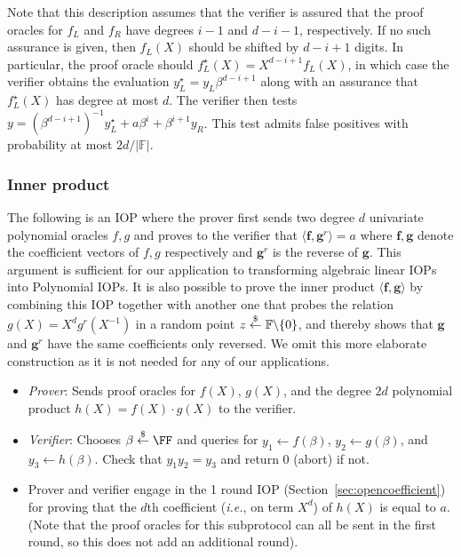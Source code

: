 Note that this description assumes that the verifier is assured that the proof oracles for $f_L$ and $f_R$ have degrees $i-1$ and $d-i-1$, respectively. If no such assurance is given, then $f_L(X)$ should be shifted by $d-i+1$ digits. In particular, the proof oracle should $f_L^\star(X) = X^{d-i+1} f_L(X)$, in which case the verifier obtains the evaluation $y_L^\star = y_L \beta^{d-i+1}$ along with an assurance that $f_L^\star(X)$ has degree at most $d$. The verifier then tests $y = (\beta^{d-i+1})^{-1}y_L^\star + a \beta^i + \beta^{i+1} y_R$. This test admits false positives with probability at most $2d/|\mathbb{F}|$.

\subsubsection{Inner product}\label{sec:innerproduct}
The following is an IOP where the prover first sends two degree $d$ univariate polynomial oracles $f, g$ and proves to the verifier that $\langle \mathbf{f}, \mathbf{g}^r \rangle = a$ where $\mathbf{f}, \mathbf{g}$ denote the coefficient vectors of $f, g$ respectively and $\mathbf{g}^r$ is the reverse of $\mathbf{g}$. This argument is sufficient for our application to transforming algebraic linear IOPs into Polynomial IOPs. It is also possible to prove the inner product $\langle \mathbf{f}, \mathbf{g} \rangle$ by combining this IOP together with another one that probes the relation $g(X) = X^dg^r(X^{-1})$ in a random point $z \overset{\$}{\gets} \mathbb{F} \backslash \{0\}$, and thereby shows that $\mathbf{g}$ and $\mathbf{g}^r$ have the same coefficients only reversed. We omit this more elaborate construction as it is not needed for any of our applications.

\begin{itemize}
\item \emph{Prover}: Sends proof oracles for $f(X)$, $g(X)$, and the degree $2d$ polynomial product $h(X) = f(X)\cdot g(X)$ to the verifier. 
\item \emph{Verifier}: Chooses $\beta \sample \FF$ and queries for $y_1 \leftarrow f(\beta)$, $y_2 \leftarrow g(\beta)$, and $y_3 \leftarrow h(\beta)$. Check that $y_1 y_2 = y_3$ and return $0$ (abort) if not.
\item Prover and verifier engage in the 1 round IOP (Section~\ref{sec:opencoefficient}) for proving that the $d$th coefficient (\emph{i.e.}, on term $X^d$) of $h(X)$ is equal to $a$. (Note that the proof oracles for this subprotocol can all be sent in the first round, so this does not add an additional round). %
\end{itemize}

